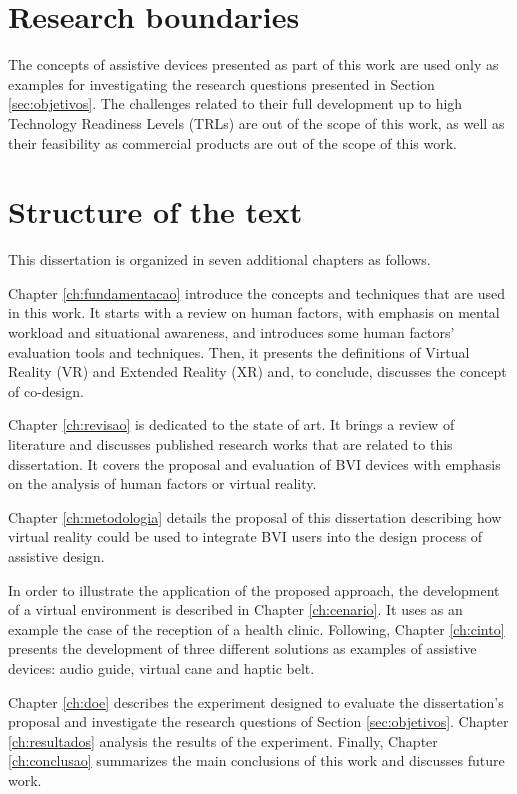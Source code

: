 \section{Research boundaries}


The concepts of assistive devices presented as part of this work are used only as examples for investigating the research questions presented in Section \ref{sec:objetivos}. The challenges related to their full development up to high Technology Readiness Levels (TRLs) are out of the scope of this work, as well as their feasibility as commercial products are out of the scope of this work.


\section{Structure of the text}

This dissertation is organized in seven additional chapters as follows.

Chapter \ref{ch:fundamentacao} introduce the concepts and techniques that are used in this work. It starts with a review on human factors, with emphasis on mental workload and situational awareness, and introduces some human factors’ evaluation tools and techniques. Then, it presents the definitions of Virtual Reality (VR) and Extended Reality (XR) and, to conclude, discusses the concept of co-design.

Chapter \ref{ch:revisao} is dedicated to the state of art. It brings a review of literature and discusses published research works that are related to this dissertation. It covers the proposal and evaluation of BVI devices with emphasis on the analysis of human factors or virtual reality.

Chapter \ref{ch:metodologia} details the proposal of this dissertation describing how virtual reality could be used to integrate BVI users into the design process of assistive design. 

In order to illustrate the application of the proposed approach, the development of a virtual environment is described in Chapter \ref{ch:cenario}. It uses as an example the case of the reception of a health clinic. Following, Chapter \ref{ch:cinto} presents the development of three different solutions as examples of assistive devices: audio guide, virtual cane and haptic belt.

Chapter \ref{ch:doe} describes the experiment designed to evaluate the dissertation’s proposal and investigate the research questions of Section \ref{sec:objetivos}. Chapter \ref{ch:resultados} analysis the results of the experiment. Finally, Chapter \ref{ch:conclusao} summarizes the main conclusions of this work and discusses future work.
